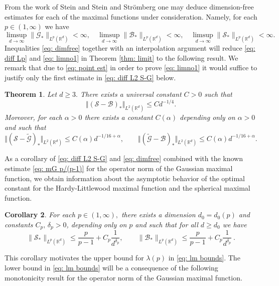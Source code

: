 \documentclass[a4paper, reqno]{amsart}
\newtheorem{thm}{Theorem}[section]
\newtheorem{corollary}[thm]{Corollary}
\theoremstyle{definition}
\newcommand{\R}{{\mathbb R}}
\newcommand{\mG}{\mathcal{G}}
\newcommand{\tmG}{\tilde{\mathcal{G}}}
\newcommand{\mB}{\mathcal{B}}
\newcommand{\mS}{\mathcal{S}}
\newcommand{\lm}{\lambda}
\begin{document}
From the work of Stein \cite{St82} and Stein and Strömberg  \cite{SS83} one may deduce
 dimension-free estimates for each of the maximal functions under consideration. Namely, for each $p\in (1,\infty)$ we have
\begin{equation}
\label{eq: dimfree}
  \limsup_{d\to\infty}   \|\mG_*\|_{L^p(\R^d)} <\infty,\quad\limsup_{d\to\infty}   \|\mB_*\|_{L^p(\R^d)}<\infty,\quad \limsup_{d\to\infty}   \|\mS_*\|_{L^p(\R^d)}<\infty.
\end{equation}
Inequalities  \eqref{eq: dimfree} together with an interpolation argument will reduce \eqref{eq: diff Lp} and \eqref{eq: limno1} in Theorem \ref{thm: limit} to the following result. We remark that due to \eqref{eq: point est} in order to prove \eqref{eq: limno1} it would suffice to justify only the first estimate in \eqref{eq: diff L2 S-G} below.
\begin{thm}\label{thm_gaussian_sphere}
Let $d\ge 3.$ There exists a universal constant $C>0$ such that 
  \begin{equation}
 \label{eq: diff L2 S-B}
 \Vert(\mS-\mB)_*\Vert_{L^2(\mathbb{R}^d)}\leq C d^{-1/4}.
 \end{equation}
Moreover, for each $\alpha>0$ there exists a constant $C(\alpha)$ depending only on $\alpha>0$ and such that 
 \begin{equation}
 \label{eq: diff L2 S-G}
    \Vert  (\mS-\tmG)_*\Vert_{L^2(\mathbb{R}^d)}\leq C(\alpha) d^{-1/16+\alpha},\qquad \Vert(\tmG-\mB)_*\Vert_{L^2(\mathbb{R}^d)}\leq C(\alpha) d^{-1/16+\alpha}.
 \end{equation}
\end{thm}
\noindent As a corollary of \eqref{eq: diff L2 S-G}  and \eqref{eq: dimfree} combined with the known estimate \eqref{eq: mG p/(p-1)} for the operator norm of the Gaussian maximal function, we obtain information about the asymptotic behavior of the optimal constant for the Hardy-Littlewood maximal function and the spherical maximal function.
\begin{corollary}
\label{cor: S,B Lp}
   For each $p\in(1,\infty),$ there exists a dimension $d_0=d_0(p)$ and constants $C_p,\, \delta_p>0$, depending only on $p$ and such that for all $d\geq d_0$ we have 
\begin{equation*}
\|\mS_*\|_{L^p(\R^d)}\leq  \frac{p}{p-1} + C_p \frac{1}{d^{\delta_p}},\qquad \|\mB_*\|_{L^p(\R^d)}\leq  \frac{p}{p-1} + C_p \frac{1}{d^{\delta_p}}~.
\end{equation*}
\end{corollary}
\noindent This corollary motivates the upper bound for $\lm(p)$ in \eqref{eq: lm bounds}. The lower bound in \eqref{eq: lm bounds} will be a consequence of the following monotonicity result for the operator norm of the Gaussian maximal function.
\end{document}
